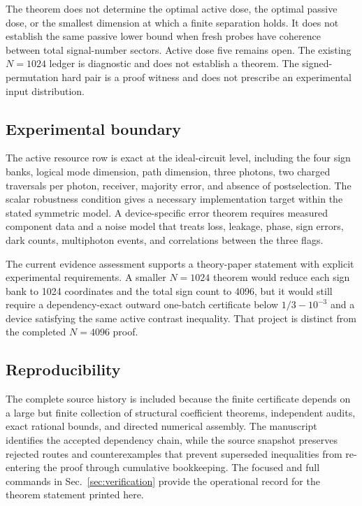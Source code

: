 The theorem does not determine the optimal active dose, the optimal passive dose, or the smallest dimension at which a finite separation holds. It does not establish the same passive lower bound when fresh probes have coherence between total signal-number sectors. Active dose five remains open. The existing $N=1024$ ledger is diagnostic and does not establish a theorem. The signed-permutation hard pair is a proof witness and does not prescribe an experimental input distribution.

\subsection{Experimental boundary}

The active resource row is exact at the ideal-circuit level, including the four sign banks, logical mode dimension, path dimension, three photons, two charged traversals per photon, receiver, majority error, and absence of postselection. The scalar robustness condition gives a necessary implementation target within the stated symmetric model. A device-specific error theorem requires measured component data and a noise model that treats loss, leakage, phase, sign errors, dark counts, multiphoton events, and correlations between the three flags.

The current evidence assessment supports a theory-paper statement with explicit experimental requirements. A smaller $N=1024$ theorem would reduce each sign bank to 1024 coordinates and the total sign count to 4096, but it would still require a dependency-exact outward one-batch certificate below $1/3-10^{-3}$ and a device satisfying the same active contrast inequality. That project is distinct from the completed $N=4096$ proof.

\subsection{Reproducibility}

The complete source history is included because the finite certificate depends on a large but finite collection of structural coefficient theorems, independent audits, exact rational bounds, and directed numerical assembly. The manuscript identifies the accepted dependency chain, while the source snapshot preserves rejected routes and counterexamples that prevent superseded inequalities from re-entering the proof through cumulative bookkeeping. The focused and full commands in Sec.~\ref{sec:verification} provide the operational record for the theorem statement printed here.
